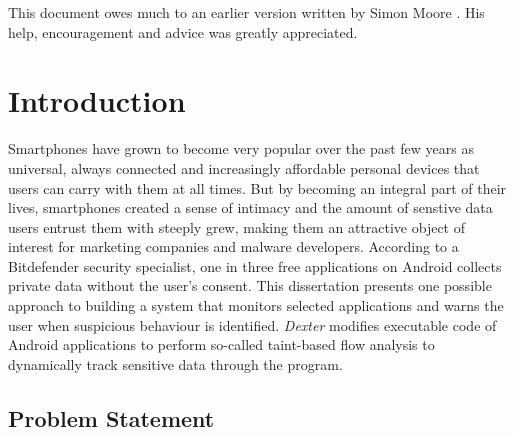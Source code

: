 \documentclass[12pt,twoside,notitlepage]{report}
\begin{document}
This document owes much to an earlier version written by Simon Moore
\cite{moore95}.  His help, encouragement and advice was greatly 
appreciated.


\cleardoublepage        %

\setcounter{page}{1}
\pagestyle{headings}

\chapter{Introduction}

Smartphones have grown to become very popular over the past few years as universal, always connected and increasingly affordable personal devices that users can carry with them at all times. But by becoming an integral part of their lives, smartphones created a sense of intimacy and the amount of senstive data users entrust them with steeply grew, making them an attractive object of interest for marketing companies and malware developers. According to a Bitdefender security specialist, one in three free applications on Android collects private data without the user's consent\cite{web:HuffingtonOneInThree}. This dissertation presents one possible approach to building a system that monitors selected applications and warns the user when suspicious behaviour is identified. \emph{Dexter} modifies executable code of Android applications to perform so-called taint-based flow analysis to dynamically track sensitive data through the program.

\section{Problem Statement}
\end{document}
